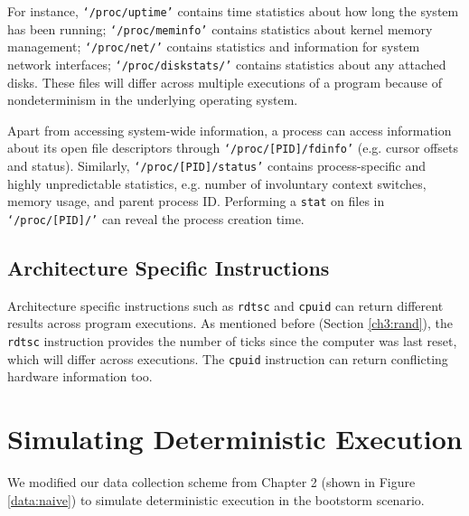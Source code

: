 For instance, \texttt{`/proc/uptime'} contains time statistics about how
long the system has been running;
\texttt{`/proc/meminfo'} contains statistics about kernel memory management;
\texttt{`/proc/net/'} contains statistics and information for system
network interfaces;
\texttt{`/proc/diskstats/'} contains statistics about any attached disks.
These files will differ across multiple executions
of a program because of nondeterminism in the underlying operating system. 

Apart from accessing system-wide information, a process can access 
information about its open file descriptors through
\texttt{`/proc/[PID]/fdinfo'} (e.g. cursor offsets and status).
Similarly, \texttt{`/proc/[PID]/status'} contains
process-specific and highly unpredictable statistics,
e.g. number of involuntary context switches,
memory usage, and parent process ID.
Performing a \texttt{stat} on files in \texttt{`/proc/[PID]/'}
can reveal the process creation time.

\subsection{Architecture Specific Instructions}
Architecture specific instructions such as \texttt{rdtsc}
and \texttt{cpuid} can return different
results across program executions. As mentioned before
(Section \ref{ch3:rand}), the \texttt{rdtsc} instruction provides the number of ticks since
the computer was last reset, which
will differ across executions. The \texttt{cpuid} instruction
can return conflicting hardware information too.

\section{Simulating Deterministic Execution} \label{ch3:simulation}
We modified our data collection scheme from Chapter 2 (shown in Figure \ref{data:naive})
to simulate deterministic execution in the bootstorm scenario.

